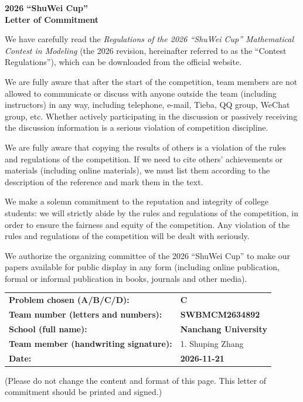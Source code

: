 \documentclass[12pt]{article}
\begin{document}
\begin{center}
{\Large\bfseries 2026 ``ShuWei Cup''}\\[4pt]
{\Large\bfseries Letter of Commitment}
\end{center}

\vspace{1.2em}

We have carefully read the \emph{Regulations of the 2026 ``ShuWei Cup'' Mathematical Contest in Modeling} (the 2026 revision, hereinafter referred to as the ``Contest Regulations''), which can be downloaded from the official website.

We are fully aware that after the start of the competition, team members are not allowed to communicate or discuss with anyone outside the team (including instructors) in any way, including telephone, e-mail, Tieba, QQ group, WeChat group, etc. Whether actively participating in the discussion or passively receiving the discussion information is a serious violation of competition discipline.

We are fully aware that copying the results of others is a violation of the rules and regulations of the competition. If we need to cite others' achievements or materials (including online materials), we must list them according to the description of the reference and mark them in the text.

We make a solemn commitment to the reputation and integrity of college students: we will strictly abide by the rules and regulations of the competition, in order to ensure the fairness and equity of the competition. Any violation of the rules and regulations of the competition will be dealt with seriously.

We authorize the organizing committee of the 2026 ``ShuWei Cup'' to make our papers available for public display in any form (including online publication, formal or informal publication in books, journals and other media).

\vspace{1.5em}

\begin{tabular}{@{}p{7.2cm}p{8.2cm}@{}}
\textbf{Problem chosen (A/B/C/D):} & \textbf{C} \\[10pt]
\textbf{Team number (letters and numbers):} & \textbf{SWBMCM2634892} \\[10pt]
\textbf{School (full name):} & \textbf{Nanchang University} \\[10pt]
\textbf{Team member (handwriting signature):} & 1. Shuping Zhang \\[14pt]
\textbf{Date:} & \textbf{2026-11-21} \\
\end{tabular}

\vfill
\begin{center}
\small (Please do not change the content and format of this page. This letter of commitment should be printed and signed.)
\end{center}
\end{document}
